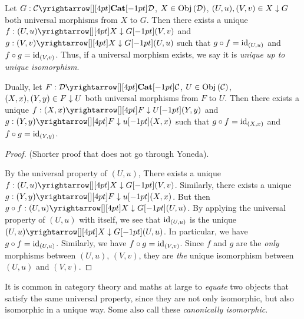 \begin{prop}\hypertarget{uniprop}{}
  
  Let $G : \map{\CC}{\DD}{\CAT}{}$, $X \in \mathrm{Obj}\left(\mathcal{D}\right)$, 
  $(U,u), (V,v) \in X\downarrow G$ both universal morphisms from $X$ to $G$. 
  Then there exists a unique $f : \map{(U,u)}{(V,v)}{X\darrow G}{}$
  and $g : \map{(V,v)}{(U,u)}{X\darrow G}{}$ such that 
  $g \circ f = \mathrm{id}_{(U,u)}$ and $f \circ g = \mathrm{id}_{(V,v)}$.
  Thus, if a universal morphism exists, 
  we say it is \emph{unique up to unique isomorphism}.

  Dually, let $F : \map{\DD}{\CC}{\CAT}{}$, $U \in \mathrm{Obj}\left(\mathcal{C}\right)$,
  $(X,x), (Y,y) \in F\downarrow U$ both universal morphisms from $F$ to $U$.
  Then there exists a unique $f : \map{(X,x)}{(Y,y)}{F\darrow U}{}$
  and $g : \map{(Y,y)}{(X,x)}{F\darrow u}{}$ such that 
  $g \circ f = \mathrm{id}_{(X,x)}$ and $f \circ g = \mathrm{id}_{(Y,y)}$.
\end{prop}
\begin{proof}(Shorter proof that does not go through Yoneda).

  By the universal property of $(U,u)$,
  There exists a unique $f : \map{(U,u)}{(V,v)}{X\darrow G}{}$.
  Similarly, there exists a unique $g : \map{(Y,y)}{(X,x)}{F\darrow u}{}$.
  But then $g \circ f : \map{(U,u)}{(U,u)}{X\darrow G}{}$.
  By applying the universal property of $(U,u)$ with itself,
  we see that $\mathrm{id}_{(U,u)}$ is the unique $\map{(U,u)}{(U,u)}{X\darrow G}{}$.
  In particular, we have $g \circ f = \mathrm{id}_{(U,u)}$.
  Similarly, we have $f \circ g = \mathrm{id}_{(V,v)}$.
  Since $f$ and $g$ are the \emph{only} morphisms between $(U,u)$, $(V,v)$,
  they are \emph{the} unique isomorphism between $(U,u)$ and $(V,v)$.
\end{proof}

\begin{rmk}
  \hypertarget{canonical}{}

  It is common in category theory and maths at large to \emph{equate} 
  two objects that satisfy the same universal property, 
  since they are not only isomorphic, but also isomorphic in a unique way. 
  Some also call these \emph{canonically isomorphic}.
\end{rmk}

